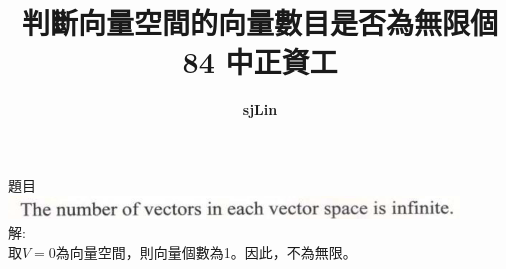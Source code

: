 \documentclass{article}
\title{判斷向量空間的向量數目是否為無限個\\
84 中正資工}
\author{\textbf{sjLin}}
\begin{document}
\begin{CJK*}{UTF8}{bkai}
{\selectfont
\maketitle
\noindent
題目\\
\includegraphics[scale=1]{./images/counting_vectors_from_vector_space.png}
\\
解:\\
取$V={0}$為向量空間，則向量個數為1。因此，不為無限。
} %
\end{CJK*}
\end{document}
